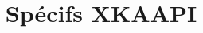 \documentclass[a4paper,10pt]{article}
\begin{document}
\title{Spécifs XKAAPI}
\maketitle
\end{document}
